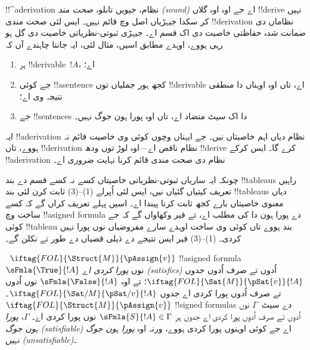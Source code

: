 \documentclass[../../../include/open-logic-section]{subfiles}
\begin{document}
      {}
      {}
      

\begin{explain}
!!^a{derivation} نظام، جیویں تابلو، \emph{صحت مند (sound)} اے جے اوہ
اوہ گلاں !!{derive} نہیں کر سکدا جیہڑیاں اصل وچ قائم نہیں۔ ایس لئی
صحت مندی !!{derivation} نظاماں دی ضمانت شدہ حفاظتی خاصیت دی اک قسم اے۔
جیہڑی ثبوتی-نظریاتی خاصیت دی گل ہو رہی ہووے، اوہدے مطابق اسیں، مثال
لئی، ایہ جاننا چاہندے آں کہ
\begin{enumerate}
\item ہر !!{derivable}~$!A$،  اے؛
\item جے کوئی !!a{sentence} کجھ ہور جملیاں توں !!{derivable} اے، تاں اوہ
  اوہناں دا منطقی نتیجہ وی اے؛
\item جے !!{sentence}s دا اک سیٹ متضاد اے، تاں اوہ پورا ہون جوگ نہیں۔
\end{enumerate}
ایہ !!a{derivation} نظام دیاں اہم خاصیتاں نیں۔ جے ایہناں وچوں کوئی
وی خاصیت قائم نہ ہووے، تاں !!{derivation} نظام ناقص اے---اوہ لوڑ
توں ودھ !!{derive} کرے گا۔ ایس کرکے !!a{derivation} نظام دی صحت
مندی قائم کرنا نہایت ضروری اے۔

چونکہ ایہ ساریاں ثبوتی-نظریاتی خاصیتاں کسے نہ کسے قسم دے بند
!!{tableau}s راہیں تعریف کیتیاں گئیاں نیں، ایس لئی اُپرلے (1)--(3)
ثابت کرن لئی بند !!{tableau}s دیاں معنوی خاصیتاں بارے کجھ ثابت کرنا
پیندا اے۔ اسیں پہلے تعریف کراں گے کہ کسے ساخت وچ !!a{signed
  formula} دے پورا ہون دا کی مطلب اے، تے فیر وکھاواں گے کہ جے کوئی
!!{tableau} بند ہووے تاں کوئی وی ساخت اوہدے سارے مفروضیاں نوں پورا
نہیں کردی۔ (1)--(3) فیر ایس نتیجے دے ذیلی قضیاں دے طور تے نکلن گے۔
\end{explain}

\begin{defn}
~$\iftag{FOL}{\Struct{M}}{\pAssign{v}}$
!!a{signed formula} $\sFmla{\True}{!A}$ نوں \emph{پورا کردی اے (satisfies)}
اُدوں تے صرف اُدوں جدوں
$\iftag{FOL}{\Sat{M}}{\pSat{v}}{!A}$؛ تے اوہ
$\sFmla{\False}{!A}$ نوں اُدوں تے صرف اُدوں پورا کردی اے جدوں
$\iftag{FOL}{\Sat/{M}}{\pSat/{v}}{!A}$۔ $\iftag{FOL}{\Struct{M}}{\pAssign{v}}$
!!{signed formula}s دے سیٹ~$\Gamma$ نوں اُدوں تے صرف اُدوں پورا
کردی اے جدوں ہر $\sFmla{S}{!A} \in \Gamma$ نوں پورا کردی اے۔
$\Gamma$، \emph{پورا ہون جوگ (satisfiable)} اے جے کوئی
 اوہنوں پورا کردی ہووے،
ورنہ اوہ \emph{پورا ہون جوگ نہیں (unsatisfiable)}۔
\end{defn}
\end{document}

